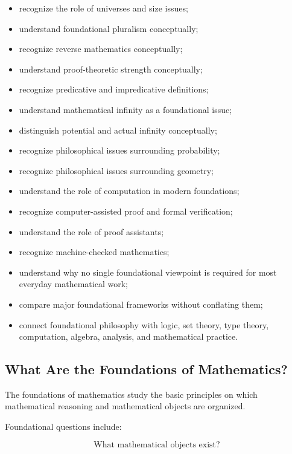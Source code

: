 {\begin{itemize}
          constraints;
    \item recognize the role of universes and size issues;
    \item understand foundational pluralism conceptually;
    \item recognize reverse mathematics conceptually;
    \item understand proof-theoretic strength conceptually;
    \item recognize predicative and impredicative definitions;
    \item understand mathematical infinity as a foundational issue;
    \item distinguish potential and actual infinity conceptually;
    \item recognize philosophical issues surrounding probability;
    \item recognize philosophical issues surrounding geometry;
    \item understand the role of computation in modern foundations;
    \item recognize computer-assisted proof and formal verification;
    \item understand the role of proof assistants;
    \item recognize machine-checked mathematics;
    \item understand why no single foundational viewpoint is required for
          most everyday mathematical work;
    \item compare major foundational frameworks without conflating them;
    \item connect foundational philosophy with logic, set theory, type
          theory, computation, algebra, analysis, and mathematical practice.
\end{itemize}
}

\subsection{What Are the Foundations of Mathematics?}
\label{subsec:what-are-mathematical-foundations}

The foundations of mathematics study the basic principles on which
mathematical reasoning and mathematical objects are organized.

Foundational questions include:

\[
\boxed{
\text{What mathematical objects exist?}
}
\]

